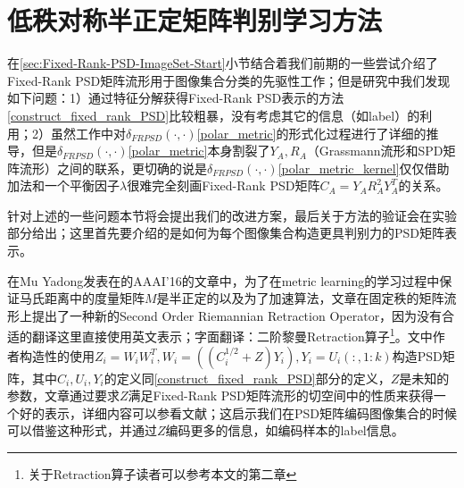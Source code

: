 \section{低秩对称半正定矩阵判别学习方法}
\label{sec:Low-Rank-PSD-Discrim-Approch}
在\ref{sec:Fixed-Rank-PSD-ImageSet-Start}小节结合着我们前期的一些尝试介绍了Fixed-Rank PSD矩阵流形用于图像集合分类的先驱性工作\cite{PSD_WACV}；但是研究中我们发现如下问题：1）通过特征分解获得Fixed-Rank PSD表示的方法\ref{construct_fixed_rank_PSD}比较粗暴，没有考虑其它的信息（如label）的利用；2）虽然工作\cite{PSD_Riemannian}中对$\delta_{FRPSD}(\cdot,\cdot)$\ref{polar_metric}的形式化过程进行了详细的推导，但是$\delta_{FRPSD}(\cdot,\cdot)$\ref{polar_metric}本身割裂了$Y_A,R_A$（Grassmann流形和SPD矩阵流形）之间的联系，更切确的说是$\delta_{FRPSD}(\cdot,\cdot)$\ref{polar_metric_kernel}仅仅借助加法和一个平衡因子$\lambda$很难完全刻画Fixed-Rank PSD矩阵$C_A=Y_{A}R_{A}^{2}Y_{A}^{T}$的关系。

针对上述的一些问题本节将会提出我们的改进方案，最后关于方法的验证会在实验部分给出；这里首先要介绍的是如何为每个图像集合构造更具判别力的PSD矩阵表示。

在Mu Yadong发表在的AAAI'16的文章\cite{PSD_AAAI}中，为了在metric learning的学习过程中保证马氏距离中的度量矩阵$M$是半正定的以及为了加速算法，文章在固定秩的矩阵流形上提出了一种新的Second Order Riemannian Retraction Operator，因为没有合适的翻译这里直接使用英文表示；字面翻译：二阶黎曼Retraction算子\footnote{关于Retraction算子读者可以参考本文的第二章}。文中作者构造性的使用$Z_{i}=W_iW_{i}^{T},W_{i}=\left((C_{i}^{1/2}+Z) Y_{i}\right),Y_{i}=U_{i}(:,1:k)$构造PSD矩阵，其中$C_{i},U_{i},Y_{i}$的定义同\ref{construct_fixed_rank_PSD}部分的定义，$Z$是未知的参数，文章\cite{PSD_AAAI}通过要求$Z$满足Fixed-Rank PSD矩阵流形的切空间中的性质来获得一个好的表示，详细内容可以参看文献\cite{PSD_AAAI}；这启示我们在PSD矩阵编码图像集合的时候可以借鉴这种形式，并通过$Z$编码更多的信息，如编码样本的label信息。

